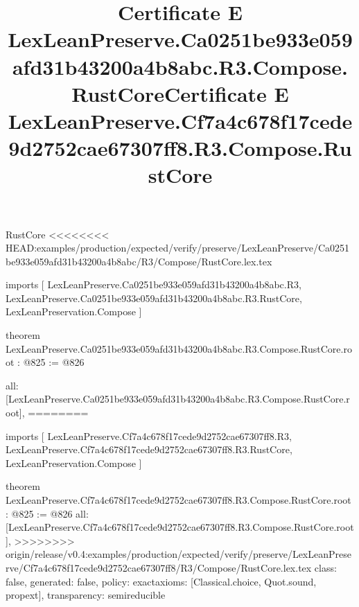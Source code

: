 \begin{lexlean}{RustCore}
<<<<<<<< HEAD:examples/production/expected/verify/preserve/LexLeanPreserve/Ca0251be933e059afd31b43200a4b8abc/R3/Compose/RustCore.lex.tex
\title{Certificate E LexLeanPreserve.Ca0251be933e059afd31b43200a4b8abc.R3.Compose.RustCore}
\begin{coremodule}
imports [
  LexLeanPreserve.Ca0251be933e059afd31b43200a4b8abc.R3,
  LexLeanPreserve.Ca0251be933e059afd31b43200a4b8abc.R3.RustCore,
  LexLeanPreservation.Compose
]

theorem LexLeanPreserve.Ca0251be933e059afd31b43200a4b8abc.R3.Compose.RustCore.root : @825 := @826 {
  all: [LexLeanPreserve.Ca0251be933e059afd31b43200a4b8abc.R3.Compose.RustCore.root],
========
\title{Certificate E LexLeanPreserve.Cf7a4c678f17cede9d2752cae67307ff8.R3.Compose.RustCore}
\begin{coremodule}
imports [
  LexLeanPreserve.Cf7a4c678f17cede9d2752cae67307ff8.R3,
  LexLeanPreserve.Cf7a4c678f17cede9d2752cae67307ff8.R3.RustCore,
  LexLeanPreservation.Compose
]

theorem LexLeanPreserve.Cf7a4c678f17cede9d2752cae67307ff8.R3.Compose.RustCore.root : @825 := @826 {
  all: [LexLeanPreserve.Cf7a4c678f17cede9d2752cae67307ff8.R3.Compose.RustCore.root],
>>>>>>>> origin/release/v0.4:examples/production/expected/verify/preserve/LexLeanPreserve/Cf7a4c678f17cede9d2752cae67307ff8/R3/Compose/RustCore.lex.tex
  class: false,
  generated: false,
  policy: exact{axioms: [Classical.choice, Quot.sound, propext]},
  transparency: semireducible
}


\end{coremodule}}
\end{coremodule}
\end{lexlean}
